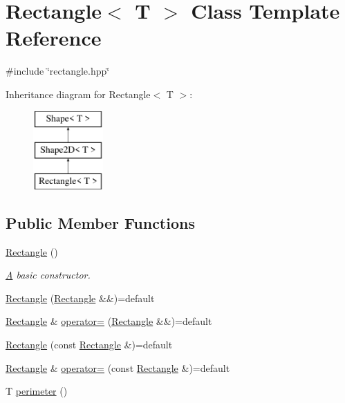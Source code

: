 \hypertarget{classRectangle}{}\section{Rectangle$<$ T $>$ Class Template Reference}
\label{classRectangle}


{\ttfamily \#include \char`\"{}rectangle.\+hpp\char`\"{}}

Inheritance diagram for Rectangle$<$ T $>$\+:\begin{figure}[H]
\begin{center}
\leavevmode
\includegraphics[height=3.000000cm]{classRectangle}
\end{center}
\end{figure}
\subsection*{Public Member Functions}
\begin{DoxyCompactItemize}
\item 
\mbox{\hyperlink{classRectangle_a9d9da3fc8bcb125516cbf2d711d325eb}{Rectangle}} ()
\begin{DoxyCompactList}\small\item\em \mbox{\hyperlink{classA}{A}} basic constructor. \end{DoxyCompactList}\item 
\mbox{\hyperlink{classRectangle_a34cf921863291153b40d9b447f812aa4}{Rectangle}} (\mbox{\hyperlink{classRectangle}{Rectangle}} \&\&)=default
\item 
\mbox{\hyperlink{classRectangle}{Rectangle}} \& \mbox{\hyperlink{classRectangle_ab53b617f14505834f525ec614ccce5c8}{operator=}} (\mbox{\hyperlink{classRectangle}{Rectangle}} \&\&)=default
\item 
\mbox{\hyperlink{classRectangle_acf27dae8f7c9a022428bda816903db2e}{Rectangle}} (const \mbox{\hyperlink{classRectangle}{Rectangle}} \&)=default
\item 
\mbox{\hyperlink{classRectangle}{Rectangle}} \& \mbox{\hyperlink{classRectangle_ad0a038c8959e5bde09bf1e8f49980bea}{operator=}} (const \mbox{\hyperlink{classRectangle}{Rectangle}} \&)=default
\item 
T \mbox{\hyperlink{classRectangle_a9c59dcb7376296711ad86e2da924d3c8}{perimeter}} ()
\end{DoxyCompactItemize}
